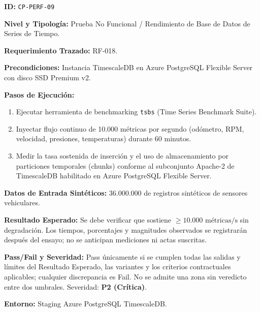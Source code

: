 \par\noindent\textbf{ID:} \texttt{C\allowbreak{}P\allowbreak{}-\allowbreak{}P\allowbreak{}E\allowbreak{}R\allowbreak{}F\allowbreak{}-\allowbreak{}0\allowbreak{}9\allowbreak{}}\par
\par\noindent\textbf{Nivel y Tipología:} Prueba No Funcional / Rendimiento de Base de Datos de Series de Tiempo.\par
\par\noindent\textbf{Requerimiento Trazado:} RF-018.\par
\par\noindent\textbf{Precondiciones:} Instancia TimescaleDB en Azure PostgreSQL Flexible Server con disco SSD Premium v2.\par
\par\noindent\textbf{Pasos de Ejecución:} \par
\begin{enumerate}
\item Ejecutar herramienta de benchmarking \texttt{t\allowbreak{}s\allowbreak{}b\allowbreak{}s\allowbreak{}} (Time Series Benchmark Suite).
\item Inyectar flujo continuo de 10.000 métricas por segundo (odómetro, RPM, velocidad, presiones, temperaturas) durante 60 minutos.
\item Medir la tasa sostenida de inserción y el uso de almacenamiento por particiones temporales (chunks) conforme al subconjunto Apache-2 de TimescaleDB habilitado en Azure PostgreSQL Flexible Server.
\end{enumerate}
\par\noindent\textbf{Datos de Entrada Sintéticos:} 36.000.000 de registros sintéticos de sensores vehiculares.\par
\par\noindent\textbf{Resultado Esperado:} Se debe verificar que sostiene \(\ge 10.000\text{ métricas/s}\) sin degradación. Los tiempos, porcentajes y magnitudes observados se registrarán después del ensayo; no se anticipan mediciones ni actas suscritas.\par
\par\noindent\textbf{Pass/Fail y Severidad:} Pass únicamente si se cumplen todas las salidas y límites del Resultado Esperado, las variantes y los criterios contractuales aplicables; cualquier discrepancia es Fail. No se admite una zona sin veredicto entre dos umbrales. Severidad: \textbf{P2 (Crítica)}.\par
\par\noindent\textbf{Entorno:} Staging Azure PostgreSQL TimescaleDB.\par







